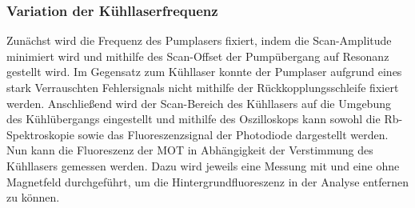 \documentclass[11pt, a4paper]{article}
\numberwithin{equation}{section}
\begin{document}
\subsubsection{Variation der Kühllaserfrequenz}
\label{sec:detuning_cooling}
Zunächst wird die Frequenz des Pumplasers fixiert, indem die Scan-Amplitude minimiert wird und mithilfe des Scan-Offset der Pumpübergang auf Resonanz gestellt wird.
Im Gegensatz zum Kühllaser konnte der Pumplaser aufgrund eines stark Verrauschten Fehlersignals nicht mithilfe der Rückkopplungsschleife fixiert werden.
Anschließend wird der Scan-Bereich des Kühllasers auf die Umgebung des Kühlübergangs eingestellt und mithilfe des Oszilloskops kann sowohl die Rb-Spektroskopie sowie das Fluoreszenzsignal der Photodiode dargestellt werden.
Nun kann die Fluoreszenz der MOT in Abhängigkeit der Verstimmung des Kühllasers gemessen werden.
Dazu wird jeweils eine Messung mit und eine ohne Magnetfeld durchgeführt, um die Hintergrundfluoreszenz in der Analyse entfernen zu können.
\end{document}
